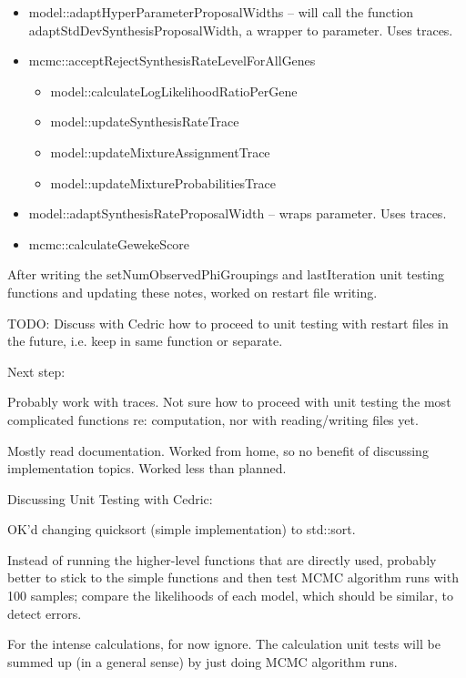 \documentclass[12pt,hyperref]{labbook}
\newcommand{\sep}{\discretionary{}{}{}} %
\begin{document}
\begin{itemize}
\begin{itemize}
        \item model::\sep adapt\sep Hyper\sep Parameter\sep Proposal\sep Widths -- 
        will call the function adapt\sep Std\sep Dev\sep Synthesis\sep Proposal\sep Width,
        a wrapper to parameter. Uses traces.
        \item mcmc::acceptRejectSynthesisRateLevelForAllGenes
        \begin{itemize}
            \item model::calculateLogLikelihoodRatioPerGene
            \item model::updateSynthesisRateTrace
            \item model::updateMixtureAssignmentTrace
            \item model::updateMixtureProbabilitiesTrace
        \end{itemize}
        \item model::\sep adapt\sep Synthesis\sep Rate\sep Proposal\sep Width -- 
        wraps parameter. Uses traces.
        \item mcmc::calculateGewekeScore
    \end{itemize}
\end{itemize}

After writing the setNumObservedPhiGroupings and lastIteration unit testing functions and
updating these notes, worked on restart file writing.

TODO: Discuss with Cedric how to proceed to unit testing with restart files
in the future, i.e. keep in same function or separate.

Next step:

Probably work with traces. Not sure how to proceed with unit testing
the most complicated functions re: computation, nor with reading/writing files yet.

Mostly read documentation. Worked from home, so no benefit of discussing implementation topics.
Worked less than planned.

Discussing Unit Testing with Cedric:

OK'd changing quicksort (simple implementation) to std::sort.

Instead of running the higher-level functions that are directly used, 
probably better to stick to the simple functions and then test MCMC algorithm runs with
100 samples; compare the likelihoods of each model, which should be similar, to detect errors.

For the intense calculations, for now ignore. The calculation unit tests will be summed up (in a
general sense) by just doing MCMC algorithm runs.
\end{document}
